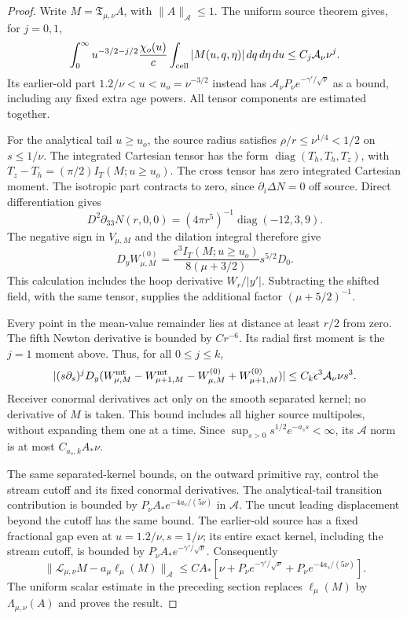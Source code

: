 \begin{proof}
Write $M=\mathfrak T_{\mu,\nu}A$, with $\|A\|_{\mathscr A}\le1$.
The uniform source theorem gives, for $j=0,1$,
\[
 \int_0^\infty u^{-3/2-j/2}\frac{\chi_o(u)}c
        \int_{\rm cell}|M(u,q,\eta)|\,dq\,d\eta\,du
       \le C_j\mathcal A_\nu\nu^j.
\]
Its earlier-old part $1.2/\nu<u<u_o=\nu^{-3/2}$ instead has
$\mathcal A_\nu P_\nu e^{-\gamma'/\sqrt\nu}$ as a bound, including
any fixed extra age powers. All tensor components are estimated together.

For the analytical tail $u\ge u_o$, the source radius satisfies
$\rho/r\le\nu^{1/4}<1/2$ on $s\le1/\nu$.
The integrated Cartesian tensor has the form
$\operatorname{diag}(T_h,T_h,T_z)$, with
$T_z-T_h=(\pi/2)I_T(M;u\ge u_o)$. The cross tensor has zero
integrated Cartesian moment. The isotropic part contracts to zero,
since $\partial_i\Delta N=0$ off source. Direct differentiation gives
\[
 D^2\partial_{33}N(r,0,0)
     =(4\pi r^5)^{-1}\operatorname{diag}(-12,3,9).
\]
The negative sign in $V_{\mu,M}$ and the dilation integral therefore give
\[
 D_yW_{\mu,M}^{(0)}
    =\frac{\epsilon^3 I_T(M;u\ge u_o)}{8(\mu+3/2)}s^{5/2}D_0.
\]
This calculation includes the hoop derivative $W_r/|y'|$.
Subtracting the shifted field, with the same tensor, supplies the
additional factor $(\mu+5/2)^{-1}$.

Every point in the mean-value remainder lies at distance at least
$r/2$ from zero. The fifth Newton derivative is bounded by $Cr^{-6}$.
Its radial first moment is the $j=1$ moment above. Thus, for all
$0\le j\le k$,
\[
 |(s\partial_s)^jD_y(W^{\rm mt}_{\mu,M}-W^{\rm mt}_{\mu+1,M}
                     -W^{(0)}_{\mu,M}+W^{(0)}_{\mu+1,M})|
       \le C_k\epsilon^3\mathcal A_\nu\nu s^3.
\]
Receiver conormal derivatives act only on the smooth separated kernel;
no derivative of $M$ is taken. This bound includes all higher source
multipoles, without expanding them one at a time. Since
$\sup_{s>0}s^{1/2}e^{-a_ss}<\infty$, its $\mathscr A$ norm is
at most $C_{a_s,k}A_*\nu$.

The same separated-kernel bounds, on the outward primitive ray,
control the stream cutoff and its fixed conormal derivatives. The
analytical-tail transition contribution is bounded by
$P_\nu A_*e^{-4a_s/(5\nu)}$ in $\mathscr A$.
The uncut leading displacement beyond the cutoff has the same bound.
The earlier-old source has a fixed fractional gap even at
$u=1.2/\nu,s=1/\nu$; its entire exact kernel, including the stream
cutoff, is bounded by $P_\nu A_*e^{-\gamma'/\sqrt\nu}$.
Consequently
\[
 \|\mathcal L_{\mu,\nu}M-a_\mu\ell_\mu(M)\|_{\mathscr A}
 \le C A_*[\nu+P_\nu e^{-\gamma'/\sqrt\nu}
                      +P_\nu e^{-4a_s/(5\nu)}].
\]
The uniform scalar estimate in the preceding section replaces
$\ell_\mu(M)$ by $\Lambda_{\mu,\nu}(A)$ and proves the result.


\end{proof}

